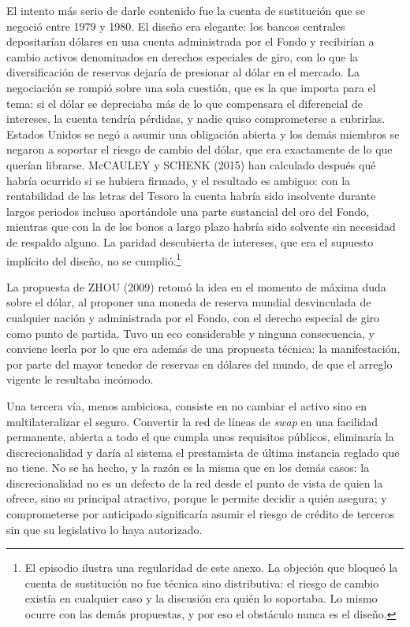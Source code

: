 \documentclass[10pt,a4paper]{article}
\newcounter{anexo}
\begin{document}
El intento más serio de darle contenido fue la cuenta de sustitución que se negoció entre 1979 y 1980. El diseño era elegante: los bancos centrales depositarían dólares en una cuenta administrada por el Fondo y recibirían a cambio activos denominados en derechos especiales de giro, con lo que la diversificación de reservas dejaría de presionar al dólar en el mercado. La negociación se rompió sobre una sola cuestión, que es la que importa para el tema: si el dólar se depreciaba más de lo que compensara el diferencial de intereses, la cuenta tendría pérdidas, y nadie quiso comprometerse a cubrirlas. Estados Unidos se negó a asumir una obligación abierta y los demás miembros se negaron a soportar el riesgo de cambio del dólar, que era exactamente de lo que querían librarse. McCAULEY y SCHENK (2015) han calculado después qué habría ocurrido si se hubiera firmado, y el resultado es ambiguo: con la rentabilidad de las letras del Tesoro la cuenta habría sido insolvente durante largos periodos incluso aportándole una parte sustancial del oro del Fondo, mientras que con la de los bonos a largo plazo habría sido solvente sin necesidad de respaldo alguno. La paridad descubierta de intereses, que era el supuesto implícito del diseño, no se cumplió.\footnote{%
    El episodio ilustra una regularidad de este anexo. La objeción que bloqueó la cuenta de sustitución no fue técnica sino distributiva: el riesgo de cambio existía en cualquier caso y la discusión era quién lo soportaba. Lo mismo ocurre con las demás propuestas, y por eso el obstáculo nunca es el diseño.
}

La propuesta de ZHOU (2009) retomó la idea en el momento de máxima duda sobre el dólar, al proponer una moneda de reserva mundial desvinculada de cualquier nación y administrada por el Fondo, con el derecho especial de giro como punto de partida. Tuvo un eco considerable y ninguna consecuencia, y conviene leerla por lo que era además de una propuesta técnica: la manifestación, por parte del mayor tenedor de reservas en dólares del mundo, de que el arreglo vigente le resultaba incómodo.

Una tercera vía, menos ambiciosa, consiste en no cambiar el activo sino en multilateralizar el seguro. Convertir la red de líneas de \textit{swap} en una facilidad permanente, abierta a todo el que cumpla unos requisitos públicos, eliminaría la discrecionalidad y daría al sistema el prestamista de última instancia reglado que no tiene. No se ha hecho, y la razón es la misma que en los demás casos: la discrecionalidad no es un defecto de la red desde el punto de vista de quien la ofrece, sino su principal atractivo, porque le permite decidir a quién asegura; y comprometerse por anticipado significaría asumir el riesgo de crédito de terceros sin que su legislativo lo haya autorizado.
\end{document}
